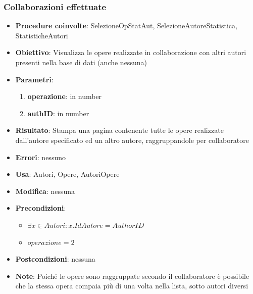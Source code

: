 \subsubsection{Collaborazioni effettuate}
\label{Collaborazioni}
\begin{itemize}
	\item \textbf{Procedure coinvolte}: SelezioneOpStatAut, SelezioneAutoreStatistica, StatisticheAutori
	\item \textbf{Obiettivo}: Visualizza le opere realizzate in collaborazione con altri autori presenti nella base di dati (anche nessuna)
	\item \textbf{Parametri}:
	\begin{enumerate}
		\item \textbf{operazione}: in number
		\item \textbf{authID}: in number
	\end{enumerate}
	\item \textbf{Risultato}: Stampa una pagina contenente tutte le opere realizzate dall'autore specificato ed un altro autore, raggruppandole per collaboratore
	\item \textbf{Errori}: nessuno
	\item \textbf{Usa}: Autori, Opere, AutoriOpere
	\item \textbf{Modifica}: nessuna
	\item \textbf{Precondizioni}:
	\begin{itemize}
		\item $\exists x \in Autori : x.IdAutore = AuthorID$
		\item $operazione  = 2$
	\end{itemize}
	\item \textbf{Postcondizioni}: nessuna
	\item \textbf{Note}: Poiché le opere sono raggruppate secondo il collaboratore
	è possibile che la stessa opera compaia più di una volta nella lista, sotto autori
	diversi
\end{itemize}

